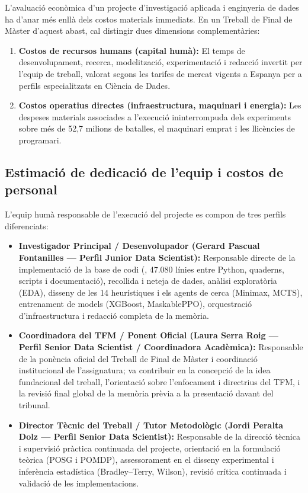 L'avaluació econòmica d'un projecte d'investigació aplicada i enginyeria de dades ha d'anar més enllà dels costos materials immediats. En un Treball de Final de Màster d'aquest abast, cal distingir dues dimensions complementàries:
\begin{enumerate}
    \item \textbf{Costos de recursos humans (capital humà):} El temps de desenvolupament, recerca, modelització, experimentació i redacció invertit per l'equip de treball, valorat segons les tarifes de mercat vigents a Espanya per a perfils especialitzats en Ciència de Dades.
    \item \textbf{Costos operatius directes (infraestructura, maquinari i energia):} Les despeses materials associades a l'execució ininterrompuda dels experiments sobre més de 52,7 milions de batalles, el maquinari emprat i les llicències de programari.
\end{enumerate}

\subsection{Estimació de dedicació de l'equip i costos de personal}
\label{subsec:costos_personal}

L'equip humà responsable de l'execució del projecte es compon de tres perfils diferenciats:
\begin{itemize}
    \item \textbf{Investigador Principal / Desenvolupador (Gerard Pascual Fontanilles --- Perfil Junior Data Scientist):} Responsable directe de la implementació de la base de codi (, 47.080 línies entre Python, quaderns, scripts i documentació), recollida i neteja de dades, anàlisi exploratòria (EDA), disseny de les 14 heurístiques i els agents de cerca (Minimax, MCTS), entrenament de models (XGBoost, MaskablePPO), orquestració d'infraestructura i redacció completa de la memòria.
    \item \textbf{Coordinadora del TFM / Ponent Oficial (Laura Serra Roig --- Perfil Senior Data Scientist / Coordinadora Acadèmica):} Responsable de la ponència oficial del Treball de Final de Màster i coordinació institucional de l'assignatura; va contribuir en la concepció de la idea fundacional del treball, l'orientació sobre l'enfocament i directrius del TFM, i la revisió final global de la memòria prèvia a la presentació davant del tribunal.
    \item \textbf{Director Tècnic del Treball / Tutor Metodològic (Jordi Peralta Dolz --- Perfil Senior Data Scientist):} Responsable de la direcció tècnica i supervisió pràctica continuada del projecte, orientació en la formulació teòrica (POSG i POMDP), assessorament en el disseny experimental i inferència estadística (Bradley--Terry, Wilson), revisió crítica continuada i validació de les implementacions.
\end{itemize}

